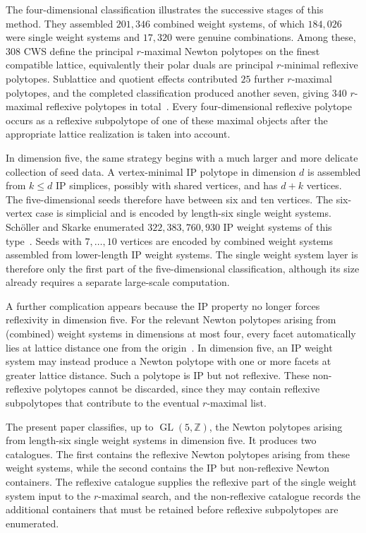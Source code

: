 \documentclass[appliedmath,article,submit,moreauthors]{Definitions/mdpi}
\newcommand{\Z}{\mathbb{Z}}
\newcommand{\GL}{\operatorname{GL}}
\begin{document}
The four-dimensional classification illustrates the successive stages of this
method. They assembled \(201{,}346\) combined weight systems, of which
\(184{,}026\) were single weight systems and \(17{,}320\) were genuine
combinations. Among these, \(308\) CWS define the principal \(r\)-maximal Newton
polytopes on the finest compatible lattice, equivalently their polar duals are
principal \(r\)-minimal reflexive polytopes. Sublattice and quotient effects
contributed \(25\) further \(r\)-maximal polytopes, and the completed
classification produced another seven, giving \(340\) \(r\)-maximal reflexive
polytopes in total~\cite{KreuzerSkarke2000,KSFibrations2002,KreuzerCYData}.
Every four-dimensional reflexive polytope occurs as a reflexive subpolytope of
one of these maximal objects after the appropriate lattice realization is taken
into account.

In dimension five, the same strategy begins with a much larger and more delicate
collection of seed data. A vertex-minimal IP polytope in dimension \(d\) is
assembled from \(k\leq d\) IP simplices, possibly with shared vertices, and has
\(d+k\) vertices. The five-dimensional seeds therefore have between six and ten
vertices. The six-vertex case is simplicial and is encoded by length-six single
weight systems. Sch\"oller and Skarke enumerated \(322{,}383{,}760{,}930\) IP
weight systems of this type~\cite{Scholler2019}. Seeds with \(7,\ldots,10\)
vertices are encoded by combined weight systems assembled from lower-length IP
weight systems. The single weight system layer is therefore only the first part
of the five-dimensional classification, although its size already requires a
separate large-scale computation.

A further complication appears because the IP property no longer forces
reflexivity in dimension five. For the relevant Newton polytopes arising from
(combined) weight systems in dimensions at most four, every facet automatically
lies at lattice distance one from the origin~\cite{Skarke1996}. In dimension
five, an IP weight system may instead produce a Newton polytope with one or more
facets at greater lattice distance. Such a polytope is IP but not reflexive.
These non-reflexive polytopes cannot be discarded, since they may contain
reflexive subpolytopes that contribute to the eventual \(r\)-maximal list. 

The present paper classifies, up to \(\GL(5,\Z)\), the Newton polytopes arising
from length-six single weight systems in dimension five. It produces two
catalogues. The first contains the reflexive Newton polytopes arising from these
weight systems, while the second contains the IP but non-reflexive Newton
containers. The reflexive catalogue supplies the reflexive part of the
single weight system input to the \(r\)-maximal search, and the non-reflexive
catalogue records the additional containers that must be retained before
reflexive subpolytopes are enumerated.
\end{document}
